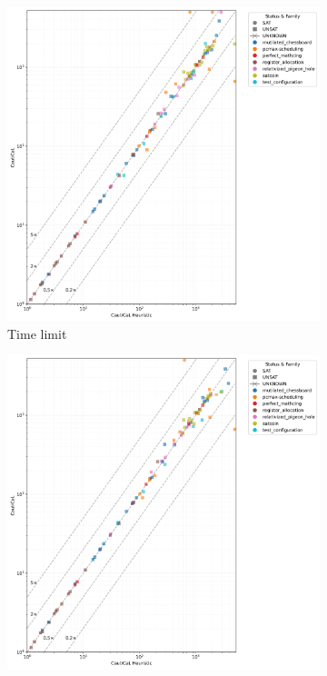 \begin{figure}[!t]
    \centering
    \begin{subfigure}[t]{0.3\textwidth}
            \centering
            \includegraphics[width=\textwidth]{figs/global_time_lim_heuristic_comparison.jpg}
            \caption{Time limit}
            \label{fig:global-time-comparison}
    \end{subfigure}
    \begin{subfigure}[t]{0.3\textwidth}
        \centering
        \includegraphics[width=\textwidth]{figs/globalbcp_heuristic_comparison.jpg}

\end{subfigure}
\end{figure}
